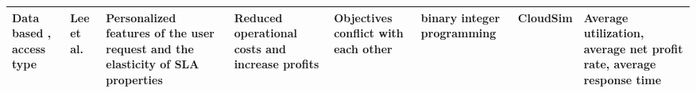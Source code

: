 \begin{sidewaystable*}[p]
{\begin{tabular}{|g{2cm} p{2cm} p{2cm} p{2cm} p{2cm} p{2cm} p{2cm} p{1.9cm}|}
Data based , access type & Lee et al.~\cite{lee2012profit} &  Personalized
features of the user request and the elasticity of SLA properties & Reduced operational costs and increase profits & Objectives conflict with each other & binary integer programming & CloudSim & Average utilization, average net profit rate, average response time  
\\ \hline
\end{tabular}
}
\end{sidewaystable*}
